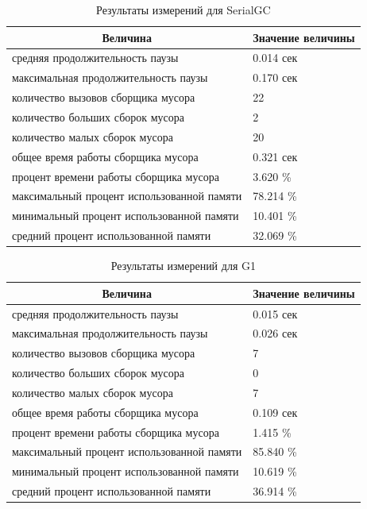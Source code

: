 \begin{table}[h!]
\caption {Результаты измерений для SerialGC}
\label{table:serialgc}
\begin{center}
\begin{tabular}{|l|l|}
\hline
\multicolumn {1}{|c|}{Величина} & \multicolumn {1}{|c|}{Значение величины}\\
\hline
средняя продолжительность паузы & 0.014 сек\\
\hline
максимальная продолжительность паузы & 0.170 сек\\
\hline
количество вызовов сборщика мусора & 22\\
\hline
количество больших сборок мусора & 2 \\
\hline
количество малых сборок мусора & 20 \\
\hline
общее время работы сборщика мусора & 0.321 сек\\
\hline
процент времени работы сборщика мусора & 3.620 \%\\
\hline
максимальный процент использованной памяти & 78.214 \%\\
\hline
минимальный процент использованной памяти & 10.401 \%\\
\hline
средний процент использованной памяти & 32.069 \%\\
\hline
\end{tabular}
\end{center}
\end{table}

\begin{table}[h!]
\caption {\label{table:g1}Результаты измерений для G1}
\begin{center}
\begin{tabular}{|l|l|}
\hline
\multicolumn{1}{|c|}{Величина} & Значение величины\\
\hline
средняя продолжительность паузы & 0.015 сек\\
\hline
максимальная продолжительность паузы & 0.026 сек\\
\hline
количество вызовов сборщика мусора & 7\\
\hline
количество больших сборок мусора & 0 \\
\hline
количество малых сборок мусора & 7 \\
\hline
общее время работы сборщика мусора & 0.109 сек\\
\hline
процент времени работы сборщика мусора & 1.415 \%\\
\hline
максимальный процент использованной памяти & 85.840 \%\\
\hline
минимальный процент использованной памяти & 10.619 \%\\
\hline
средний процент использованной памяти & 36.914 \%\\
\hline
\end{tabular}
\end{center}
\end{table}

